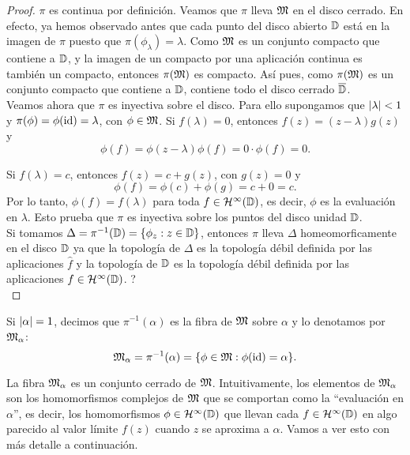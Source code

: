 \begin{proof}
$\pi$ es continua por definición. Veamos que $\pi$ lleva $\mathfrak{M}$ en el disco cerrado. En efecto, ya hemos observado antes que cada punto del disco abierto $\mathbb{D}$ está en la imagen de $\pi$ puesto que $\pi (\phi_\lambda) = \lambda$. Como $\mathfrak{M}$ es un conjunto compacto que contiene a $\mathbb{D}$, y la imagen de un compacto por una aplicación continua es también un compacto, entonces $\pi(\mathfrak{M})$ es compacto. Así pues, como $\pi(\mathfrak{M})$ es un conjunto compacto que contiene a $\mathbb{D}$, contiene todo el disco cerrado $\overline{\mathbb{D}}$. \\

Veamos ahora que $\pi$ es inyectiva sobre el disco. Para ello supongamos que $\left\lvert\lambda\right\rvert < 1$ y $\pi (\phi) = \phi (\operatorname{id}) = \lambda$, con $\phi \in \mathfrak{M}$. Si $f(\lambda) = 0$, entonces $f(z) = (z - \lambda) g(z)$ y
\begin{equation*}
    \phi(f) = \phi(z - \lambda) \phi(f) = 0 \cdot \phi(f) = 0.
\end{equation*}

Si $f(\lambda) = c$, entonces $f(z) = c + g(z)$, con $g(z) = 0$ y
\begin{equation*}
    \phi(f) = \phi(c) + \phi(g) = c + 0 = c.
\end{equation*}
Por lo tanto, $\phi(f) = f(\lambda)$ para toda $f \in \mathcal{H}^{\infty}(\mathbb{D})$, es decir, $\phi$ es la evaluación en $\lambda$. Esto prueba que $\pi$ es inyectiva sobre los puntos del disco unidad $\mathbb{D}$. \\

Si tomamos $\Delta = \pi^{-1} (\mathbb{D}) = \{\phi_z : z \in \mathbb{D}\}$, entonces $\pi$ lleva $\Delta$ homeomorficamente en el disco $\mathbb{D}$ ya que la topología de $\Delta$ es la topología débil definida por las aplicaciones $\widehat f$ y la topología de $\mathbb{D}$ es la topología débil definida por las aplicaciones $f \in \mathcal{H}^{\infty}(\mathbb{D})$. ?\\
\end{proof}

Si $\left\lvert\alpha\right\rvert = 1$, decimos que $\pi^{-1} (\alpha)$ es la fibra de $\mathfrak{M}$ sobre $\alpha$ y lo denotamos por $\mathfrak{M}_\alpha$:
\begin{equation*}
    \mathfrak{M}_\alpha = \pi^{-1} (\alpha) = \{\phi \in \mathfrak{M} : \phi (\operatorname{id}) = \alpha\}.
\end{equation*}

La fibra $\mathfrak{M}_\alpha$ es un conjunto cerrado de $\mathfrak{M}$. Intuitivamente, los elementos de $\mathfrak{M}_\alpha$ son los homomorfismos complejos de $\mathfrak{M}$ que se comportan como la ``evaluación en $\alpha$'', es decir, los homomorfismos $\phi \in \mathcal{H}^{\infty}(\mathbb{D})$ que llevan cada $f \in \mathcal{H}^{\infty}(\mathbb{D})$ en algo parecido al valor límite $f(z)$ cuando $z$ se aproxima a $\alpha$. Vamos a ver esto con más detalle a continuación. \\

